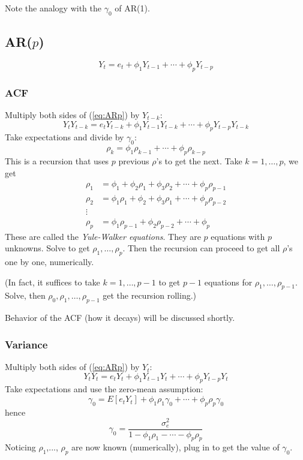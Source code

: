 \documentclass[12pt]{article}
\begin{document}
Note the analogy with the $\gamma_0$ of AR(1).

\subsection{AR($p$)}

\begin{equation}\label{eq:ARp}
Y_t = e_t + \phi_1 Y_{t-1} +\dotsb+ \phi_p Y_{t-p}
\end{equation}

\subsubsection{ACF}

Multiply both sides of (\ref{eq:ARp}) by $Y_{t-k}$:
\[
Y_t Y_{t-k}
= e_t Y_{t-k} + \phi_1 Y_{t-1} Y_{t-k} +\dotsb+ \phi_p Y_{t-p} Y_{t-k}
\]
Take expectations and divide by $\gamma_0$:
\[
\rho_k = \phi_1 \rho_{k-1} + \dotsb + \phi_p \rho_{k-p}
\]
This is a recursion that uses $p$ previous $\rho$'s to get the next.
Take $k=1,\dotsc,p$, we get
\[\begin{split}
\rho_1 &= \phi_1 + \phi_2 \rho_1 + \phi_3 \rho_2 +\dotsb+
            \phi_p\rho_{p-1}
\\
\rho_2 &= \phi_1 \rho_1 + \phi_2 + \phi_3 \rho_1 +\dotsb+
            \phi_p\rho_{p-2}
\\
\vdots &
\\
\rho_p &= \phi_1 \rho_{p-1} + \phi_2 \rho_{p-2} +\dotsb+
            \phi_p
\end{split}
\]
These are called the \emph{Yule-Walker equations}.
They are $p$ equations with $p$ unknowns.
Solve to get
$\rho_1,\dotsc,\rho_p$.
Then the recursion can proceed to get all $\rho$'s one by one,
numerically.

(In fact,
it suffices to take $k=1,\dotsc,p-1$ to get $p-1$ equations
for $\rho_1,\dotsc,\rho_{p-1}$.
Solve,
then $\rho_0,\rho_1,\dotsc,\rho_{p-1}$ get the recursion rolling.)

Behavior of the ACF (how it decays) will be discussed shortly.

\subsubsection{Variance}

Multiply both sides of (\ref{eq:ARp}) by $Y_t$:
\[
Y_t Y_t = e_t Y_t + \phi_1 Y_{t-1} Y_t +\dotsb+ \phi_p Y_{t-p} Y_t
\]
Take expectations and use the zero-mean assumption:
\[
\gamma_0 = E[e_t Y_t] + \phi_1 \rho_1 \gamma_0 +\dotsb+ \phi_p \rho_p \gamma_0
\]
hence
\[
\gamma_0
= \frac{\sigma_e^2}{1 - \phi_1 \rho_1 - \dotsb - \phi_p \rho_p}
\]
Noticing $\rho_1$,..., $\rho_p$ are now known
(numerically),
plug in to get the value of $\gamma_0$.
\end{document}
